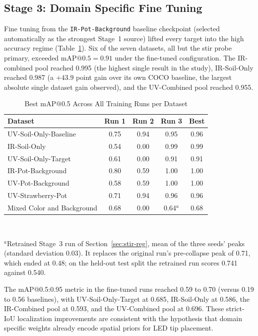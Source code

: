 ﻿\documentclass[journal]{IEEEtran}
\begin{document}
\subsection{Stage 3: Domain Specific Fine Tuning}
Fine tuning from the \texttt{IR-Pot-Background} baseline checkpoint (selected automatically as the strongest Stage~1 source) lifted every target into the high accuracy regime (Table~\ref{tab:best}). Six of the seven datasets, all but the stir probe primary, exceeded $\text{mAP@0.5}=0.91$ under the fine-tuned configuration. The IR-combined pool reached 0.995 (the highest single result in the study), IR-Soil-Only reached 0.987 (a $+43.9$ point gain over its own COCO baseline, the largest absolute single dataset gain observed), and the UV-Combined pool reached 0.955.

\begin{table}[!t]
\renewcommand{\arraystretch}{1.3}
\caption{Best mAP@0.5 Across All Training Runs per Dataset}
\label{tab:best}
\centering
\begin{tabular}{l c c c c}
\toprule
\textbf{Dataset} & \textbf{Run 1} & \textbf{Run 2} & \textbf{Run 3} & \textbf{Best} \\
\midrule
UV-Soil-Only-Baseline & 0.75 & 0.94 & 0.95 & 0.96 \\
IR-Soil-Only & 0.54 & 0.00 & 0.99 & 0.99 \\
UV-Soil-Only-Target & 0.61 & 0.00 & 0.91 & 0.91 \\
IR-Pot-Background & 0.80 & 0.59 & 1.00 & 1.00 \\
UV-Pot-Background & 0.58 & 0.59 & 1.00 & 1.00 \\
UV-Strawberry-Pot & 0.71 & 0.94 & 0.96 & 0.96 \\
Mixed Color and Background & 0.68 & 0.00 & 0.64$^{a}$ & 0.68 \\
\bottomrule
\end{tabular}
\\[2pt]
\parbox{\columnwidth}{\footnotesize $^{a}$Retrained Stage~3 run of Section~\ref{sec:stir-reg}, mean of the three seeds' peaks (standard deviation 0.03). It replaces the original run's pre-collapse peak of 0.71, which ended at 0.48; on the held-out test split the retrained run scores 0.741 against 0.540.}
\end{table}

The mAP@0.5:0.95 metric in the fine-tuned runs reached 0.59 to 0.70 (versus 0.19 to 0.56 baselines), with UV-Soil-Only-Target at 0.685, IR-Soil-Only at 0.586, the IR-Combined pool at 0.593, and the UV-Combined pool at 0.696. These strict-IoU localization improvements are consistent with the hypothesis that domain specific weights already encode spatial priors for LED tip placement.
\end{document}
